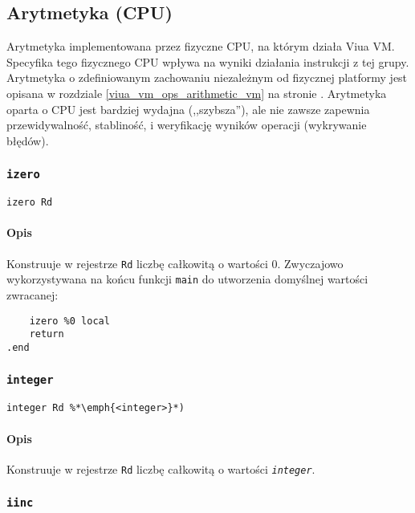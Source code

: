 \subsection{Arytmetyka (CPU)}
\label{viua_vm_ops_arithmetic_cpu}

Arytmetyka implementowana przez fizyczne CPU, na którym działa Viua VM.
Specyfika tego fizycznego CPU wpływa na wyniki działania instrukcji z tej grupy.
Arytmetyka o zdefiniowanym zachowaniu niezależnym od fizycznej platformy jest
opisana w rozdziale \ref{viua_vm_ops_arithmetic_vm} na stronie
\pageref{viua_vm_ops_arithmetic_vm}. Arytmetyka oparta o CPU jest
bardziej wydajna (,,szybsza''), ale nie zawsze zapewnia przewidywalność,
stabliność, i weryfikację wyników operacji (wykrywanie błędów).

\subsubsection{\texttt{izero}}

\begin{lstlisting}
izero Rd
\end{lstlisting}

\paragraph*{Opis} Konstruuje w rejestrze \texttt{Rd} liczbę całkowitą o wartości 0.
Zwyczajowo wykorzystywana na końcu funkcji \texttt{main} do utworzenia domyślnej wartości zwracanej:

\begin{lstlisting}
	izero %0 local
	return
.end
\end{lstlisting}

\subsubsection{\texttt{integer}}

\begin{lstlisting}
integer Rd %*\emph{<integer>}*)
\end{lstlisting}

\paragraph*{Opis} Konstruuje w rejestrze \texttt{Rd} liczbę całkowitą o wartości \emph{\texttt{integer}}.

\subsubsection{\texttt{iinc}}

